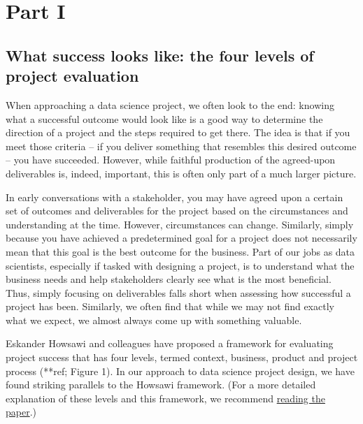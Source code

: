 \documentclass[
]{book}
\begin{document}
\hypertarget{part-part-i}{%
\part*{Part I}\label{part-part-i}}

\hypertarget{levels}{%
\chapter{What success looks like: the four levels of project evaluation}\label{levels}}

When approaching a data science project, we often look to the end: knowing what a successful outcome would look like is a good way to determine the direction of a project and the steps required to get there. The idea is that if you meet those criteria -- if you deliver something that resembles this desired outcome -- you have succeeded. However, while faithful production of the agreed-upon deliverables is, indeed, important, this is often only part of a much larger picture.

In early conversations with a stakeholder, you may have agreed upon a certain set of outcomes and deliverables for the project based on the circumstances and understanding at the time. However, circumstances can change. Similarly, simply because you have achieved a predetermined goal for a project does not necessarily mean that this goal is the best outcome for the business. Part of our jobs as data scientists, especially if tasked with designing a project, is to understand what the business needs and help stakeholders clearly see what is the most beneficial. Thus, simply focusing on deliverables falls short when assessing how successful a project has been. Similarly, we often find that while we may not find exactly what we expect, we almost always come up with something valuable.

Eskander Howsawi and colleagues have proposed a framework for evaluating project success that has four levels, termed context, business, product and project process (**ref; Figure 1). In our approach to data science project design, we have found striking parallels to the Howsawi framework. (For a more detailed explanation of these levels and this framework, we recommend \href{https://www.researchgate.net/publication/263164826_The_four-level_project_success_framework_application_and_assessment}{reading the paper}.)
\end{document}

